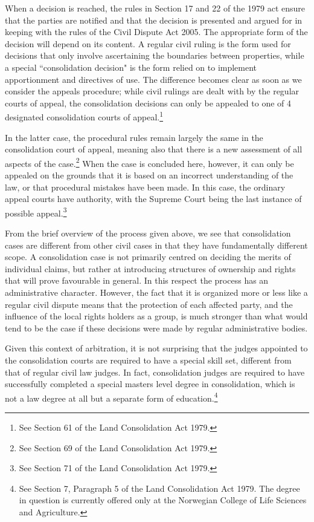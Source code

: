 When a decision is reached, the rules in Section 17 and 22 of the 1979 act ensure that the parties are notified and that the decision is presented and argued for in keeping with the rules of the Civil Dispute Act 2005. The appropriate form of the decision will depend on its content. A regular civil ruling is the form used for decisions that only involve ascertaining the boundaries between properties, while a special ``consolidation decision" is the form relied on to implement apportionment and directives of use. The difference becomes clear as soon as we consider the appeals procedure; while civil rulings are dealt with by the regular courts of appeal, the consolidation decisions can only be appealed to one of 4 designated consolidation courts of appeal.\footnote{See Section 61 of the Land Consolidation Act 1979.} 

In the latter case, the procedural rules remain largely the same in the consolidation court of appeal, meaning also that there is a new assessment of all aspects of the case.\footnote{See Section 69 of the Land Consolidation Act 1979.} When the case is concluded here, however, it can only be appealed on the grounds that it is based on an incorrect understanding of the law, or that procedural mistakes have been made. In this case, the ordinary appeal courts have authority, with the Supreme Court being the last instance of possible appeal.\footnote{See Section 71 of the Land Consolidation Act 1979.}

From the brief overview of the process given above, we see that consolidation cases are different from other civil cases in that they have fundamentally different scope. A consolidation case is not primarily centred on deciding the merits of individual claims, but rather at introducing structures of ownership and rights that will prove favourable in general. In this respect the process has an administrative character. However, the fact that it is organized more or less like a regular civil dispute means that the protection of each affected party, and the influence of the local rights holders as a group, is much stronger than what would tend to be the case if these decisions were made by regular administrative bodies.

Given this context of arbitration, it is not surprising that the judges appointed to the consolidation courts are required to have a special skill set, different from that of regular civil law judges. In fact, consolidation judges are required to have successfully completed a special masters level degree in consolidation, which is not a law degree at all but a separate form of education.\footnote{See Section 7, Paragraph 5 of the Land Consolidation Act 1979. The degree in question is currently offered only at the Norwegian College of Life Sciences and Agriculture.} 

